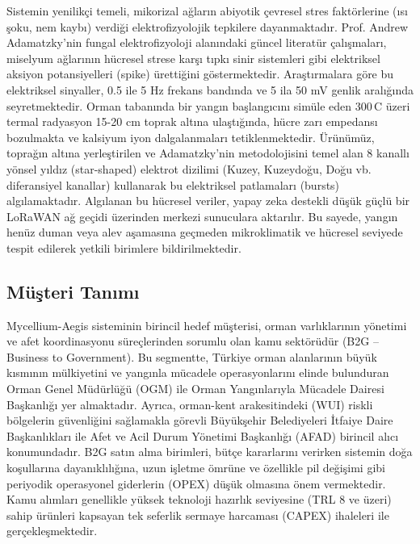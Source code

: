 \documentclass[11pt,a4paper]{article}
\begin{document}
Sistemin yenilikçi temeli, mikorizal ağların abiyotik çevresel stres faktörlerine (ısı şoku, nem kaybı) verdiği elektrofizyolojik tepkilere dayanmaktadır. Prof. Andrew Adamatzky'nin fungal elektrofizyoloji alanındaki güncel literatür çalışmaları, miselyum ağlarının hücresel strese karşı tıpkı sinir sistemleri gibi elektriksel aksiyon potansiyelleri (spike) ürettiğini göstermektedir. Araştırmalara göre bu elektriksel sinyaller, 0.5 ile 5 Hz frekans bandında ve 5 ila 50 mV genlik aralığında seyretmektedir. Orman tabanında bir yangın başlangıcını simüle eden 300\,\textdegree C üzeri termal radyasyon 15-20 cm toprak altına ulaştığında, hücre zarı empedansı bozulmakta ve kalsiyum iyon dalgalanmaları tetiklenmektedir. Ürünümüz, toprağın altına yerleştirilen ve Adamatzky'nin metodolojisini temel alan 8 kanallı yönsel yıldız (star-shaped) elektrot dizilimi (Kuzey, Kuzeydoğu, Doğu vb. diferansiyel kanallar) kullanarak bu elektriksel patlamaları (bursts) algılamaktadır. Algılanan bu hücresel veriler, yapay zeka destekli düşük güçlü bir LoRaWAN ağ geçidi üzerinden merkezi sunuculara aktarılır. Bu sayede, yangın henüz duman veya alev aşamasına geçmeden mikroklimatik ve hücresel seviyede tespit edilerek yetkili birimlere bildirilmektedir.

\subsection{Müşteri Tanımı}

Mycellium-Aegis sisteminin birincil hedef müşterisi, orman varlıklarının yönetimi ve afet koordinasyonu süreçlerinden sorumlu olan kamu sektörüdür (B2G -- Business to Government). Bu segmentte, Türkiye orman alanlarının büyük kısmının mülkiyetini ve yangınla mücadele operasyonlarını elinde bulunduran Orman Genel Müdürlüğü (OGM) ile Orman Yangınlarıyla Mücadele Dairesi Başkanlığı yer almaktadır. Ayrıca, orman-kent arakesitindeki (WUI) riskli bölgelerin güvenliğini sağlamakla görevli Büyükşehir Belediyeleri İtfaiye Daire Başkanlıkları ile Afet ve Acil Durum Yönetimi Başkanlığı (AFAD) birincil alıcı konumundadır. B2G satın alma birimleri, bütçe kararlarını verirken sistemin doğa koşullarına dayanıklılığına, uzun işletme ömrüne ve özellikle pil değişimi gibi periyodik operasyonel giderlerin (OPEX) düşük olmasına önem vermektedir. Kamu alımları genellikle yüksek teknoloji hazırlık seviyesine (TRL 8 ve üzeri) sahip ürünleri kapsayan tek seferlik sermaye harcaması (CAPEX) ihaleleri ile gerçekleşmektedir.
\end{document}
